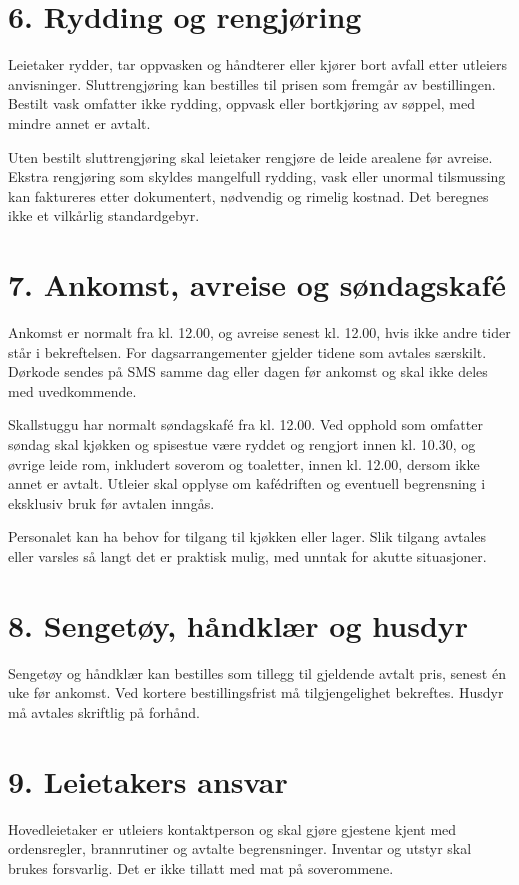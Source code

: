 \documentclass[12pt,a4paper]{article}
\begin{document}
\section{6. Rydding og rengjøring}
Leietaker rydder, tar oppvasken og håndterer eller kjører bort avfall etter utleiers anvisninger. Sluttrengjøring kan bestilles til prisen som fremgår av bestillingen. Bestilt vask omfatter ikke rydding, oppvask eller bortkjøring av søppel, med mindre annet er avtalt.

Uten bestilt sluttrengjøring skal leietaker rengjøre de leide arealene før avreise. Ekstra rengjøring som skyldes mangelfull rydding, vask eller unormal tilsmussing kan faktureres etter dokumentert, nødvendig og rimelig kostnad. Det beregnes ikke et vilkårlig standardgebyr.


\section{7. Ankomst, avreise og søndagskafé}
Ankomst er normalt fra kl. 12.00, og avreise senest kl. 12.00, hvis ikke andre tider står i bekreftelsen. For dagsarrangementer gjelder tidene som avtales særskilt. Dørkode sendes på SMS samme dag eller dagen før ankomst og skal ikke deles med uvedkommende.

Skallstuggu har normalt søndagskafé fra kl. 12.00. Ved opphold som omfatter søndag skal kjøkken og spisestue være ryddet og rengjort innen kl. 10.30, og øvrige leide rom, inkludert soverom og toaletter, innen kl. 12.00, dersom ikke annet er avtalt. Utleier skal opplyse om kafédriften og eventuell begrensning i eksklusiv bruk før avtalen inngås.

Personalet kan ha behov for tilgang til kjøkken eller lager. Slik tilgang avtales eller varsles så langt det er praktisk mulig, med unntak for akutte situasjoner.


\section{8. Sengetøy, håndklær og husdyr}
Sengetøy og håndklær kan bestilles som tillegg til gjeldende avtalt pris, senest én uke før ankomst. Ved kortere bestillingsfrist må tilgjengelighet bekreftes. Husdyr må avtales skriftlig på forhånd.


\section{9. Leietakers ansvar}
Hovedleietaker er utleiers kontaktperson og skal gjøre gjestene kjent med ordensregler, brannrutiner og avtalte begrensninger. Inventar og utstyr skal brukes forsvarlig. Det er ikke tillatt med mat på soverommene.
\end{document}

